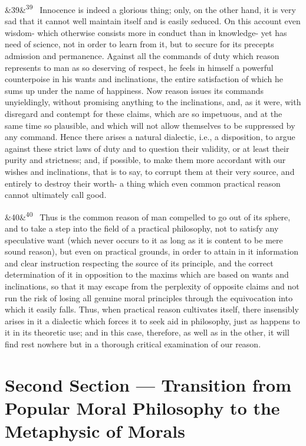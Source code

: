 \documentclass[12pt]{article}
\newcommand{\para}[1][]{\par\noindent\ifx&#1&\else\textsuperscript{\footnotesize #1}~\fi}
\begin{document}
\para[39] Innocence is indeed a glorious thing; only, on the other hand, it is very sad that it cannot well maintain itself and is easily seduced. On this account even wisdom- which otherwise consists more in conduct than in knowledge- yet has need of science, not in order to learn from it, but to secure for its precepts admission and permanence. Against all the commands of duty which reason represents to man as so deserving of respect, he feels in himself a powerful counterpoise in his wants and inclinations, the entire satisfaction of which he sums up under the name of happiness. Now reason issues its commands unyieldingly, without promising anything to the inclinations, and, as it were, with disregard and contempt for these claims, which are so impetuous, and at the same time so plausible, and which will not allow themselves to be suppressed by any command. Hence there arises a natural dialectic, i.e., a disposition, to argue against these strict laws of duty and to question their validity, or at least their purity and strictness; and, if possible, to make them more accordant with our wishes and inclinations, that is to say, to corrupt them at their very source, and entirely to destroy their worth- a thing which even common practical reason cannot ultimately call good.

\para[40] Thus is the common reason of man compelled to go out of its sphere, and to take a step into the field of a practical philosophy, not to satisfy any speculative want (which never occurs to it as long as it is content to be mere sound reason), but even on practical grounds, in order to attain in it information and clear instruction respecting the source of its principle, and the correct determination of it in opposition to the maxims which are based on wants and inclinations, so that it may escape from the perplexity of opposite claims and not run the risk of losing all genuine moral principles through the equivocation into which it easily falls. Thus, when practical reason cultivates itself, there insensibly arises in it a dialectic which forces it to seek aid in philosophy, just as happens to it in its theoretic use; and in this case, therefore, as well as in the other, it will find rest nowhere but in a thorough critical examination of our reason.

\section*{Second Section --- Transition from Popular Moral Philosophy to the Metaphysic of Morals}
\end{document}
